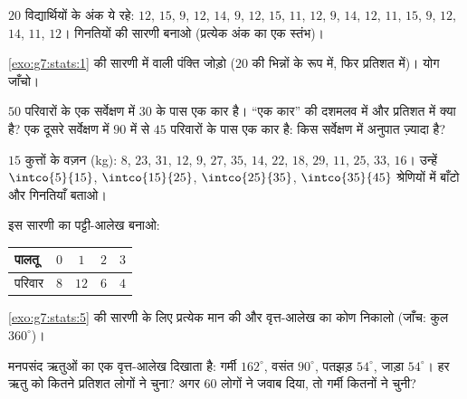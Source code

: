\begin{exercise}[$\star$]\label{exo:g7:stats:1}
$20$ विद्यार्थियों के अंक ये रहे: $12$, $15$, $9$, $12$, $14$,
$9$, $12$, $15$, $11$, $12$, $9$, $14$, $12$, $11$, $15$, $9$, $12$,
$14$, $11$, $12$। गिनतियों की सारणी बनाओ (प्रत्येक अंक का एक स्तंभ)।
\end{exercise}

\begin{exercise}[$\star$]\label{exo:g7:stats:2}
\cref{exo:g7:stats:1} की सारणी में  वाली पंक्ति जोड़ो
($20$ की भिन्नों के रूप में, फिर प्रतिशत में)। योग जाँचो।
\end{exercise}

\begin{exercise}[$\star$]\label{exo:g7:stats:3}
$50$ परिवारों के एक सर्वेक्षण में $30$ के पास एक कार है।
``एक कार'' की  दशमलव में और प्रतिशत में क्या है? एक दूसरे
सर्वेक्षण में $90$ में से $45$ परिवारों के पास एक कार है: किस
सर्वेक्षण में अनुपात ज़्यादा है?
\end{exercise}

\begin{exercise}[$\star$]\label{exo:g7:stats:4}
$15$ कुत्तों के वज़न (kg): $8$, $23$, $31$, $12$, $9$, $27$, $35$,
$14$, $22$, $18$, $29$, $11$, $25$, $33$, $16$। उन्हें
$\intco{5}{15}$, $\intco{15}{25}$, $\intco{25}{35}$,
$\intco{35}{45}$ श्रेणियों में बाँटो और गिनतियाँ बताओ।
\end{exercise}

\begin{exercise}[$\star$]\label{exo:g7:stats:5}
इस सारणी का पट्टी-आलेख बनाओ:
\begin{center}
\renewcommand{\arraystretch}{1.2}
\begin{tabular}{l|cccc}
पालतू & $0$ & $1$ & $2$ & $3$ \\
\hline
परिवार & $8$ & $12$ & $6$ & $4$ \\
\end{tabular}
\end{center}
\end{exercise}

\begin{exercise}[$\star$]\label{exo:g7:stats:6}
\cref{exo:g7:stats:5} की सारणी के लिए प्रत्येक मान की  और
वृत्त-आलेख का कोण निकालो (जाँच: कुल $360^\circ$)।
\end{exercise}

\begin{exercise}[$\star$]\label{exo:g7:stats:7}
मनपसंद ऋतुओं का एक वृत्त-आलेख दिखाता है: गर्मी $162^\circ$, वसंत
$90^\circ$, पतझड़ $54^\circ$, जाड़ा $54^\circ$। हर ऋतु को कितने
प्रतिशत लोगों ने चुना? अगर $60$ लोगों ने जवाब दिया, तो गर्मी
कितनों ने चुनी?
\end{exercise}

